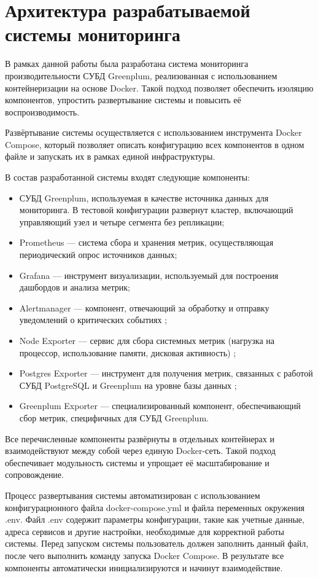 \section{Архитектура разрабатываемой системы мониторинга} \label{ch2:architecture} %

В рамках данной работы была разработана система мониторинга производительности СУБД Greenplum, реализованная с использованием контейнеризации на основе Docker. Такой подход позволяет обеспечить изоляцию компонентов, упростить развертывание системы и повысить её воспроизводимость.

Развёртывание системы осуществляется с использованием инструмента Docker Compose, который позволяет описать конфигурацию всех компонентов в одном файле и запускать их в рамках единой инфраструктуры.

В состав разработанной системы входят следующие компоненты:
\begin{itemize}
	\item СУБД Greenplum, используемая в качестве источника данных для мониторинга. В тестовой конфигурации развернут кластер, включающий управляющий узел и четыре сегмента без репликации;
	\item Prometheus — система сбора и хранения метрик, осуществляющая периодический опрос источников данных;
	\item Grafana — инструмент визуализации, используемый для построения дашбордов и анализа метрик;
	\item Alertmanager — компонент, отвечающий за обработку и отправку уведомлений о критических событиях \cite{alertmanager};
	\item Node Exporter — сервис для сбора системных метрик (нагрузка на процессор, использование памяти, дисковая активность) \cite{nodeexporter};
	\item Postgres Exporter — инструмент для получения метрик, связанных с работой СУБД PostgreSQL и Greenplum на уровне базы данных \cite{exporter};
	\item Greenplum Exporter — специализированный компонент, обеспечивающий сбор метрик, специфичных для СУБД Greenplum.
\end{itemize}

Все перечисленные компоненты развёрнуты в отдельных контейнерах и взаимодействуют между собой через единую Docker-сеть. Такой подход обеспечивает модульность системы и упрощает её масштабирование и сопровождение.

Процесс развертывания системы автоматизирован с использованием конфигурационного файла docker-compose.yml и файла переменных окружения .env. Файл .env содержит параметры конфигурации, такие как учетные данные, адреса сервисов и другие настройки, необходимые для корректной работы системы. Перед запуском системы пользователь должен заполнить данный файл, после чего выполнить команду запуска Docker Compose. В результате все компоненты автоматически инициализируются и начинут взаимодействие.

